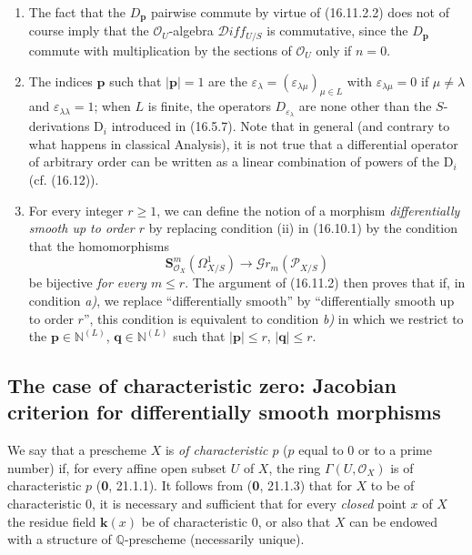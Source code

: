 \begin{remarks}[16.11.3]\label{IV.16.11.3}
\begin{enumerate}
  \item[(i)] The fact that the $D_{\mathbf{p}}$ pairwise commute by
  virtue of (16.11.2.2) does not of course imply that the
  $\mathcal{O}_U$-algebra $\mathscr{D}\!iff_{U/S}$ is commutative, since the
  $D_{\mathbf{p}}$ commute with multiplication by the sections of
  $\mathcal{O}_U$ only if $n=0$.
  \item[(ii)] The indices $\mathbf{p}$ such that $|\mathbf{p}|=1$ are the
  $\varepsilon_\lambda
  =(\varepsilon_{\lambda\mu})_{\mu\in L}$ with
  $\varepsilon_{\lambda\mu}=0$ if $\mu\neq\lambda$ and
  $\varepsilon_{\lambda\lambda}=1$; when $L$ is finite, the operators
  $D_{\varepsilon_\lambda}$ are none other than the
  $S$-derivations $\mathrm{D}_i$ introduced in (16.5.7). Note that in general
  (and contrary to what happens in classical Analysis), it is not
  true that a differential operator of arbitrary order can be written as a
  linear combination of powers of the $\mathrm{D}_i$ (cf. (16.12)).
  \item[(iii)] For every integer $r\geq1$, we can define the notion of a
  morphism \emph{differentially smooth up to order $r$} by replacing
  condition (ii) in (16.10.1) by the condition that the homomorphisms
  \[
    \mathbf{S}_{\mathcal{O}_X}^m(\varOmega_{X/S}^1)
    \longrightarrow\mathscr{G}r_m(\mathscr{P}_{X/S})
  \]
  be bijective \emph{for every $m\leq r$}. The argument of (16.11.2)
  then proves that if, in condition \emph{a)}, we replace ``differentially
  smooth'' by ``differentially smooth up to order $r$'', this condition
  is equivalent to condition \emph{b)} in which we restrict to the
  $\mathbf{p}\in\mathbb{N}^{(L)}$, $\mathbf{q}\in\mathbb{N}^{(L)}$ such that
  $|\mathbf{p}|\leq r$, $|\mathbf{q}|\leq r$.
\end{enumerate}
\end{remarks}

\subsection{The case of characteristic zero: Jacobian criterion for
differentially smooth morphisms}

\begin{env}[16.12.1]\label{IV.16.12.1}
We say that a prescheme $X$ is \emph{of characteristic $p$} ($p$ equal to $0$
or to a prime number) if, for every affine open subset $U$ of $X$, the ring
$\Gamma(U,\mathcal{O}_X)$ is of characteristic $p$ (\textbf{0}, 21.1.1). It follows
from (\textbf{0}, 21.1.3) that for $X$ to be of characteristic $0$, it is necessary and
sufficient that for every \emph{closed} point $x$ of $X$ the residue field
$\boldsymbol{k}(x)$ be of characteristic $0$, or also that $X$ can be endowed with a
structure of $\mathbb{Q}$-prescheme (necessarily unique).
\end{env}

